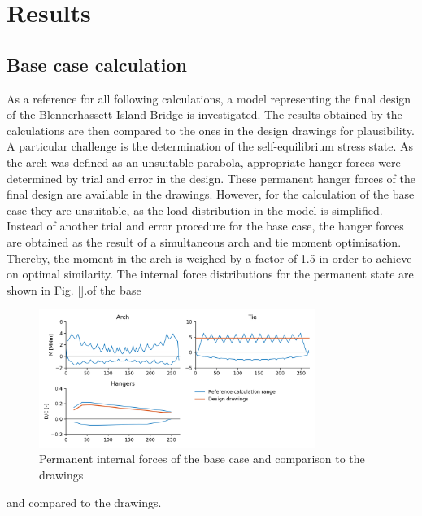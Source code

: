 \section{Results}\label{sec:results}

\subsection{Base case calculation}
As a reference for all following calculations, a model representing the final design of the Blennerhassett Island Bridge is investigated. The results obtained by the calculations are then compared to the ones in the design drawings for plausibility. A particular challenge is the determination of the self-equilibrium stress state. As the arch was defined as an unsuitable parabola, appropriate hanger forces were determined by trial and error in the design. These permanent hanger forces of the final design are available in the drawings. However, for the calculation of the base case they are unsuitable, as the load distribution in the model is simplified. Instead of another trial and error procedure for the base case, the hanger forces are obtained as the result of a simultaneous arch and tie moment optimisation. Thereby, the moment in the arch is weighed by a factor of 1.5 in order to achieve on optimal similarity. The internal force distributions for the permanent state are shown in Fig. [].of the base

\begin{figure}
    \centering
    \includegraphics[width=0.8\textwidth]{calculations/Base case/Live load.png}
    \caption{Permanent internal forces of the base case and comparison to the drawings}
    \label{fig:base_case_permanent}
\end{figure}
and compared to the drawings.
